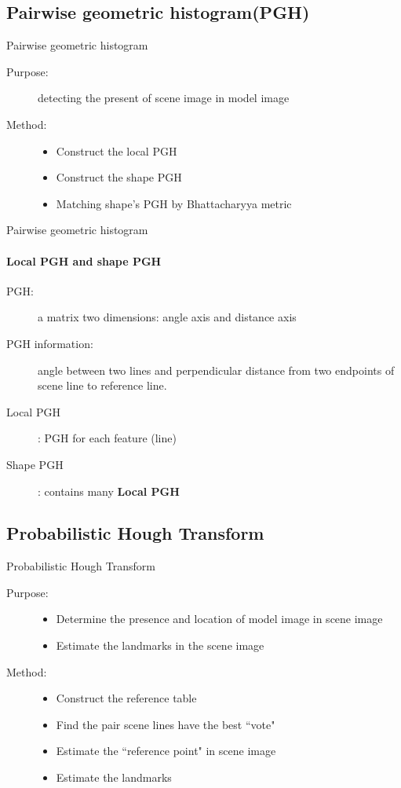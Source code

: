 \documentclass{beamer}
\begin{document}
\subsection{Pairwise geometric histogram(PGH)}
\begin{frame}{Pairwise geometric histogram}
	\begin{description}
		\item[Purpose:] detecting the present of scene image in model image
		\item[Method:]
		\begin{itemize}
			\item Construct the local PGH
			\item Construct the shape PGH
			\item Matching shape's PGH by Bhattacharyya metric
		\end{itemize}
	\end{description}
\end{frame}
\begin{frame}{Pairwise geometric histogram}
	\framesubtitle{Local PGH and shape PGH}
	\begin{description}
		\item[PGH:] a matrix two dimensions: angle axis and distance axis
		\item[PGH information:] angle between two lines and perpendicular distance from two endpoints of scene line to reference line.
		\item[Local PGH]: PGH for each feature (line)
		\item[Shape PGH]: contains many \textbf{Local PGH}
	\end{description}
\end{frame}
\subsection{Probabilistic Hough Transform}
\begin{frame}{Probabilistic Hough Transform}
	\begin{description}
		\item[Purpose:]
			\begin{itemize}
				\item Determine the presence and location of model image in scene image
				\item Estimate the landmarks in the scene image
			\end{itemize}
		\item[Method:]
		\begin{itemize}
			\item Construct the reference table
			\item Find the pair scene lines have the best ``vote"
			\item Estimate the ``reference point" in scene image
			\item Estimate the landmarks
		\end{itemize}
	\end{description}
\end{frame}
\end{document}
